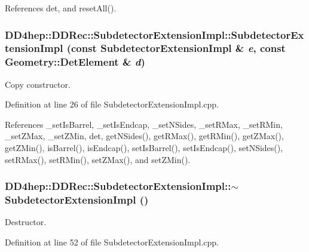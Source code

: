 References det, and resetAll().\hypertarget{class_d_d4hep_1_1_d_d_rec_1_1_subdetector_extension_impl_a9443068ab7f0f9c8da31798bac46fab7}{
\subsubsection[{SubdetectorExtensionImpl}]{\setlength{\rightskip}{0pt plus 5cm}DD4hep::DDRec::SubdetectorExtensionImpl::SubdetectorExtensionImpl (const {\bf SubdetectorExtensionImpl} \& {\em e}, \/  const {\bf Geometry::DetElement} \& {\em d})}}
\label{class_d_d4hep_1_1_d_d_rec_1_1_subdetector_extension_impl_a9443068ab7f0f9c8da31798bac46fab7}


Copy constructor. 

Definition at line 26 of file SubdetectorExtensionImpl.cpp.

References \_\-setIsBarrel, \_\-setIsEndcap, \_\-setNSides, \_\-setRMax, \_\-setRMin, \_\-setZMax, \_\-setZMin, det, getNSides(), getRMax(), getRMin(), getZMax(), getZMin(), isBarrel(), isEndcap(), setIsBarrel(), setIsEndcap(), setNSides(), setRMax(), setRMin(), setZMax(), and setZMin().\hypertarget{class_d_d4hep_1_1_d_d_rec_1_1_subdetector_extension_impl_afd3a7134db3e0d40b6fc9cdbb809f147}{
\subsubsection[{$\sim$SubdetectorExtensionImpl}]{\setlength{\rightskip}{0pt plus 5cm}DD4hep::DDRec::SubdetectorExtensionImpl::$\sim$SubdetectorExtensionImpl ()}}
\label{class_d_d4hep_1_1_d_d_rec_1_1_subdetector_extension_impl_afd3a7134db3e0d40b6fc9cdbb809f147}


Destructor. 

Definition at line 52 of file SubdetectorExtensionImpl.cpp.

